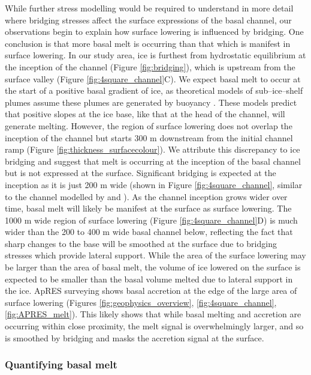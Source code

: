 While further stress modelling would be required to understand in more detail where bridging stresses affect the surface expressions of the basal channel, our observations begin to explain how surface lowering is influenced by bridging. One conclusion is that more basal melt is occurring than that which is manifest in surface lowering. %
In our study area, ice is furthest from hydrostatic equilibrium at the inception of the channel (Figure \ref{fig:bridging}), which is upstream from the surface valley (Figure \ref{fig:4square_channel}C). 
We expect basal melt to occur at the start of a positive basal gradient of ice, as theoretical models \cite [e.g.][] {jenkins2011convection} of sub--ice--shelf plumes assume these plumes are generated by buoyancy \citep{jenkins1991one}. These models predict that positive slopes at the ice base, like that at the head of the channel, will generate melting. 
However, the region of surface lowering does not overlap the inception of the channel but starts 300 m downstream from the initial channel ramp (Figure \ref{fig:thickness_surfacecolour}). 
We attribute this discrepancy to ice bridging and suggest that melt is occurring at the inception of the basal channel but is not expressed at the surface. Significant bridging is expected at the inception as it is just 200 m wide (shown in Figure \ref{fig:4square_channel}, similar to the channel modelled by \cite{drews2015evolution} and \cite{wearing2021ice}). As the channel inception grows wider over time, basal melt will likely be manifest at the surface as surface lowering. 
The 1000 m wide region of surface lowering (Figure \ref{fig:4square_channel}D) is much wider than the 200 to 400 m wide basal channel below, reflecting the fact that sharp changes to the base will be smoothed at the surface due to bridging  stresses which provide lateral support. While the area of the surface lowering may be larger than the area of basal melt, the volume of ice lowered on the surface is expected to be smaller than the basal volume melted due to lateral support in the ice.
ApRES surveying shows basal accretion at the edge of the large area of surface lowering (Figures \ref{fig:geophysics_overview}, \ref{fig:4square_channel}, \ref{fig:APRES_melt}). This likely shows that while basal melting and accretion are occurring within close proximity, the melt signal is overwhelmingly larger, and so is smoothed by bridging and masks the accretion signal at the surface.

\subsubsection{Quantifying basal melt} \label{sec:melt}

